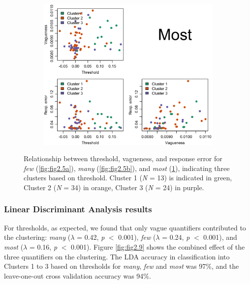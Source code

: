 \documentclass{article}
\begin{document}
\begin{figure} [H]\ContinuedFloat
\centering
    \begin{subfigure}[b]{0.99\textwidth}
    \centering
     \includegraphics[width=\linewidth]{Figure2.5c.png}
     \caption{\label{fig:fig2.5c}}
    \end{subfigure}
    \caption{Relationship between threshold, vagueness, and response error for \textit{few} (\ref{fig:fig2.5a}), \textit{many} (\ref{fig:fig2.5b}), and \textit{most} (\ref{fig:fig2.5c}), indicating three clusters based on threshold. Cluster 1 (\textit{N} = 13) is indicated in green, Cluster 2 (\textit{N} = 34) in orange, Cluster 3 (\textit{N} = 24) in purple.}
    \label{fig:fig2.5}
\end{figure}
\fi

\subsubsection{Linear Discriminant Analysis results}
For thresholds, as expected, we found that only vague quantifiers contributed to the clustering: \textit{many} ($\lambda$ = 0.42, \textit{p} $<$ 0.001), \textit{few} ($\lambda$ = 0.24, \textit{p} $<$ 0.001), and  \textit{most} ($\lambda$ = 0.16, \textit{p} $<$ 0.001). Figure \ref{fig:fig2.9} shows the combined effect of the three quantifiers on the clustering. The LDA accuracy in classification into Clusters 1 to 3 based on thresholds for \textit{many}, \textit{few} and \textit{most} was 97\%, and the leave-one-out cross validation accuracy was 94\%.
\end{document}
